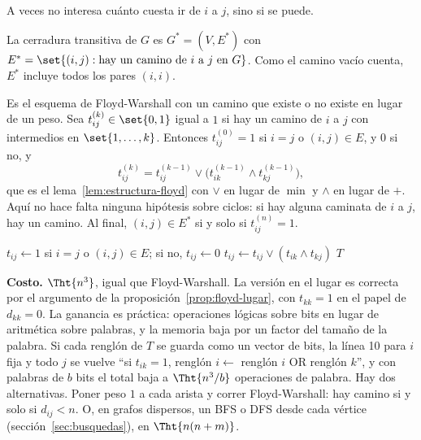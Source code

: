 \documentclass[11pt,letterpaper]{article}
\begin{document}
A veces no interesa cuánto cuesta ir de $i$ a $j$, sino si se puede.

\begin{definicion}
  \label{def:cerradura-pares}
  La cerradura transitiva de $G$ es $G^* = (V, E^*)$ con
  $E^* = \set{(i, j) : \text{hay un camino de } i \text{ a } j
  \text{ en } G}$. Como el camino vacío cuenta, $E^*$ incluye todos
  los pares $(i, i)$.
\end{definicion}

Es el esquema de Floyd-Warshall con un camino que existe o no existe
en lugar de un peso. Sea $t^{(k)}_{ij} \in \set{0, 1}$ igual a $1$ si
hay un camino de $i$ a $j$ con intermedios en $\set{1, \dots, k}$.
Entonces $t^{(0)}_{ij} = 1$ si $i = j$ o $(i, j) \in E$, y $0$ si no, y
\[
  t^{(k)}_{ij} = t^{(k-1)}_{ij} \lor
                 \bigl( t^{(k-1)}_{ik} \land t^{(k-1)}_{kj} \bigr) ,
\]
que es el lema~\ref{lem:estructura-floyd} con $\lor$ en lugar de
$\min$ y $\land$ en lugar de $+$. Aquí no hace falta ninguna hipótesis
sobre ciclos: si hay alguna caminata de $i$ a $j$, hay un camino. Al
final, $(i, j) \in E^*$ si y solo si $t^{(n)}_{ij} = 1$.

\begin{algorithm}[H]
\caption{\textsc{Cerradura-Transitiva}$(G)$, en el lugar}
\label{alg:cerradura-transitiva}
\begin{algorithmic}[1]
      \State $t_{ij} \gets 1$ si $i = j$ o $(i, j) \in E$; si no,
             $t_{ij} \gets 0$
    \EndFor
  \EndFor
        \State $t_{ij} \gets t_{ij} \lor (t_{ik} \land t_{kj})$
      \EndFor
    \EndFor
  \EndFor
  \State \Return $T$
\EndProcedure
\end{algorithmic}
\end{algorithm}

\textbf{Costo.} $\Tht{n^3}$, igual que Floyd-Warshall. La versión en
el lugar es correcta por el argumento de la
proposición~\ref{prop:floyd-lugar}, con $t_{kk} = 1$ en el papel de
$d_{kk} = 0$. La ganancia es práctica: operaciones lógicas sobre bits
en lugar de aritmética sobre palabras, y la memoria baja por un factor
del tamaño de la palabra. Si cada renglón de $T$ se guarda como un
vector de bits, la línea 10 para $i$ fija y todo $j$ se vuelve ``si
$t_{ik} = 1$, renglón $i \gets$ renglón $i$ OR renglón $k$'', y con
palabras de $b$ bits el total baja a $\Tht{n^3 / b}$ operaciones de
palabra. Hay dos alternativas. Poner peso $1$ a cada arista y correr
Floyd-Warshall: hay camino si y solo si $d_{ij} < n$. O, en grafos
dispersos, un BFS o DFS desde cada vértice
(sección~\ref{sec:busquedas}), en $\Tht{n(n + m)}$.
\end{document}
